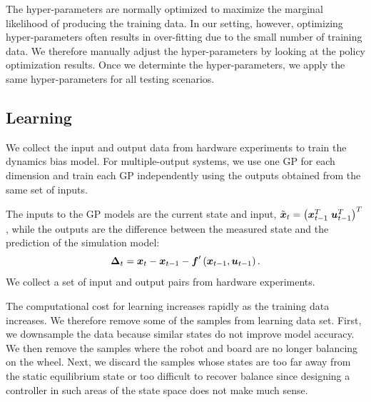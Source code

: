 

The hyper-parameters are normally optimized to maximize the marginal
likelihood of producing the training data.
In our setting, however, optimizing hyper-parameters often results in
over-fitting due to the small number of training data.
We therefore manually adjust the hyper-parameters by looking at the
policy optimization results.
Once we determinte the hyper-parameters, we apply the
same hyper-parameters for all testing scenarios.


\subsection{Learning} \label{sec:learning_learning}

We collect the input and output data from hardware experiments to train
the dynamics bias model.
For multiple-output systems, we use one GP for each dimension and train each GP
independently using the outputs obtained from the same set of inputs.

The inputs to the GP models are the current state and input,
$\tilde{\mbox{\boldmath \(x\)}}_t = \left(\mbox{\boldmath \(x\)}_{t-1}^T\;
\mbox{\boldmath \(u\)}_{t-1}^T\right)^T$, while the outputs are the difference
between the measured state and the prediction of the simulation model:
\begin{equation}
\mbox{\boldmath \(\Delta\)}_t = \mbox{\boldmath \(x\)}_t - \mbox{\boldmath \(x\)}_{t-1} - \mbox{\boldmath \(f\)}'\left(\mbox{\boldmath \(x\)}_{t-1},\mbox{\boldmath \(u\)}_{t-1}\right).
\end{equation}
We collect a set of input and output pairs from hardware experiments.

The computational cost for learning increases rapidly as the training
data increases.
We therefore remove some of the samples from learning data set.
First, we downsample the data because similar states do not improve
model accuracy.
We then remove the samples where the robot and board are no longer
balancing on the wheel.
Next, we discard the samples whose states are too far away from the static
equilibrium state or too difficult to recover balance since designing a
controller in such areas of the state space does not make much sense. 


